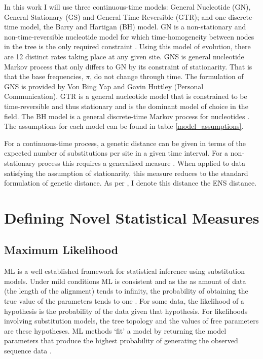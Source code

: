 In this work I will use three continuous-time models: General Nucleotide (GN),  General Stationary (GS) and General Time Reversible (GTR); and one discrete-time model, the Barry and Hartigan (BH) model. GN is a non-stationary and non-time-reversible nucleotide model for which time-homogeneity between nodes in the tree is the only required constraint \citep{Kaehler2015}. Using this model of evolution, there are 12 distinct rates taking place at any given site. GNS is general nucleotide Markov process that only differs to GN by its constraint of stationarity. That is that the base frequencies, $\pi$, do not change through time. The formulation of GNS is provided by Von Bing Yap and Gavin Huttley (Personal Communication). GTR is a general nucleotide model that is constrained to be time-reversible and thus stationary \citep{Lanave1984ARates} and is the dominant model of choice in the field. The BH model is a general discrete-time Markov process for nucleotides \citep{Barry1987StatisticalEvolution}. The assumptions for each model can be found in table \ref{model_assumptions}.



For a continuous-time process, a genetic distance can be given in terms of the expected number of substitutions per site in a given time interval. For a non-stationary process this requires a generalised measure \citep{Kaehler2015}. When applied to data satisfying the assumption of stationarity, this measure reduces to the standard formulation of genetic distance. As per \cite{Kaehler2015}, I denote this distance the ENS distance. 

\section{Defining Novel Statistical Measures}

\subsection{Maximum Likelihood}

ML is a well established framework for statistical inference using substitution models. Under mild conditions ML is consistent and as the as amount of data (the length of the alignment) tends to infinity, the probability of obtaining the true value of the parameters tends to one \citep{Chang1996FullConsistency}. For some data, the likelihood of a hypothesis is the probability of the data given that hypothesis. For likelihoods involving substitution models, the tree topology and the values of free parameters are these hypotheses. ML methods `fit' a model by returning the model parameters that produce the highest probability of generating the observed sequence data \citep{Edwards1972Likelihood, Felsenstein1981EvolutionaryApproach}.

